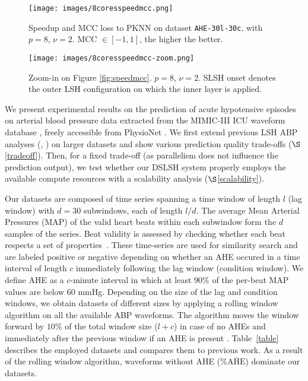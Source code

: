 \documentclass{article}
\begin{document}
\begin{figure}[b]
	\begin{minipage}{.45\textwidth}
		\centering
		\texttt{[image: images/8coresspeedmcc.png]}
		\caption{Speedup and MCC loss to PKNN on dataset \texttt{AHE-30l-30c}, with $p=8$, $\nu=2$. MCC $\in [-1,1]$, the higher the better. }
		\label{fig:speedmcc}
	\end{minipage} \hspace{15pt}
	\begin{minipage}{.45\textwidth}
		\centering
		\texttt{[image: images/8coresspeedmcc-zoom.png]}
		\caption{Zoom-in on Figure \ref{fig:speedmcc}. $p=8$, $\nu=2$. SLSH onset denotes the outer LSH configuration on which the inner layer is applied.}
		\label{fig:speedmcczoom}
	\end{minipage}
\end{figure}

We present experimental results on the prediction of acute hypotensive episodes on arterial blood pressure data extracted from the MIMIC-III ICU waveform database \cite{MIMICIII}, freely accessible from PhysioNet \cite{PhysioNet}.
We first extend previous LSH ABP analyses (\cite{LSHprediction}, \cite{SLSHretrieval}) on larger datasets and show various prediction quality trade-offs ($\S$\ref{tradeoff}).  Then, for a fixed trade-off (as parallelism does not influence the prediction output), we test whether our DSLSH system properly employs the available compute resources with a scalability analysis ($\S$\ref{scalability}).

Our datasets are composed of time series spanning a time window of length $l$ (lag window) with $d=30$ subwindows, each of length $l/d$. The average Mean Arterial Pressures (MAP) of the valid heart beats within each subwindow form the $d$ samples of the series. Beat validity is assessed by checking whether each beat respects a set of properties~\cite{BeatDB}. These time-series are used for similarity search and are labeled positive or negative depending on whether an AHE occured in a time interval of length $c$ immediately following the lag window (condition window).
We define AHE as a $c$-minute interval in which at least $90\%$ of the per-beat MAP values are below $60$ mmHg.
Depending on the size of the lag and condition windows, we obtain datasets of different sizes by applying a rolling window algorithm on all the available ABP waveforms. The algorithm moves the window forward by $10\%$ of the total window size ($l + c$) in case of no AHEs and immediately after the previous window if an AHE is present \cite{BeatDB}.
Table~\ref{table} describes the employed datasets and compares them to previous work. As a result of the rolling window algorithm, waveforms without AHE ($\%\overline{\text{AHE}}$) dominate our datasets.
\end{document}
